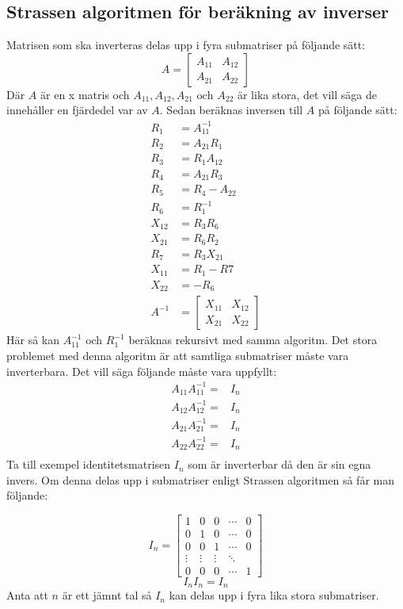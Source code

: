 \subsection{Strassen algoritmen för beräkning av inverser}
\label{sec:inverse_nackdelar}
Matrisen som ska inverteras delas upp i fyra submatriser på följande sätt:
$$A=\begin{bmatrix}
A_{11} & A_{12} \\
A_{21}& A_{22}
 \end{bmatrix}
 $$
 Där $A$ är en \scalebox{1.2}{$n$}x\scalebox{1.2}{$n$} matris och $A_{11},A_{12},A_{21}\text{ och } A_{22}$ är lika stora, det vill säga de innehåller en fjärdedel var av $A$.
 Sedan beräknas inversen till $A$ på följande sätt\citep{Petkovic2013}:
 \begin{align*}
  R_1 & =A_{11}^{-1} \\
  R_2 & =A_{21}R_1 \\
  R_3 & =R_1A_{12} \\
  R_4 & =A_{21}R_3 \\
  R_5 & =R_4 -A_{22} \\
  R_6 & =R_1^{-1} \\
  X_{12} & =R_3R_6 \\
  X_{21} & =R_6R_2 \\
  R_7 & =R_3X_{21} \\
  X_{11} & =R_1 -R7 \\
  X_{22} & =-R_6 \\
 A^{-1} & =\begin{bmatrix}
X_{11} & X_{12} \\
X_{21}& X_{22}
 \end{bmatrix}
 \end{align*}
 Här så kan $A_{11}^{-1}$ och $R_1^{-1}$ beräknas rekursivt med samma algoritm. Det stora problemet med denna algoritm är att samtliga submatriser måste vara inverterbara. Det vill säga följande måste vara uppfyllt:
 \begin{align*}
   A_{11}A_{11}^{-1}= & I_n \\
   A_{12}A_{12}^{-1}= & I_n \\
   A_{21}A_{21}^{-1}= & I_n \\
   A_{22}A_{22}^{-1}= & I_n \\
 \end{align*}
 Ta till exempel identitetsmatrisen $I_n$ som är inverterbar då den är sin egna invers. Om denna delas upp i submatriser enligt Strassen algoritmen så får man följande:
 
 $$ I_n =
 \begin{bmatrix}
   1 & 0 & 0 & \cdots & 0 \\
  0 & 1 & 0 & \cdots & 0 \\
  0 & 0 & 1 & \cdots & 0 \\
  \vdots  & \vdots  & \vdots & \ddots  \\
  0 & 0 & 0 & \cdots & 1
 \end{bmatrix}
 $$
 $$I_nI_n=I_n$$
 Anta att $n$ är ett jämnt tal så $I_n$ kan delas upp i fyra lika stora submatriser.
 
